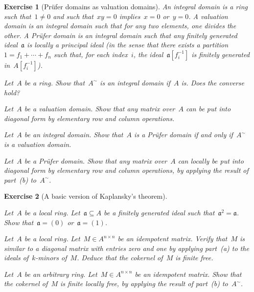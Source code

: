 \documentclass{ws-rv9x6}
\newtheorem{ex}{Exercise}
\newenvironment{exercise}[1]{
  \begin{ex}[#1]
}{\end{ex}}
\newcommand{\aaa}{\mathfrak{a}}
\renewcommand{\_}{\mathpunct{.}}
\newcommand{\?}{\,{:}\,}
\begin{document}
\begin{exercise}{Prüfer domains as valuation domains}%
An \emph{integral domain} is a ring such that~$1 \neq 0$ and such that~$xy = 0$
implies~$x = 0$ or~$y = 0$. A \emph{valuation domain} is an integral domain
such that for any two elements, one divides the other. A \emph{Prüfer domain}
is an integral domain such that any finitely generated ideal~$\aaa$ is locally a
principal ideal (in the sense that there exists a partition~$1 = f_1 + \cdots +
f_n$ such that, for each index~$i$, the ideal~$\aaa[f_i^{-1}]$ is finitely
generated in~$A[f_i^{-1}]$).
\begin{alphlist}[(d)]
\item Let~$A$ be a ring. Show that~$A^\sim$ is an integral domain if~$A$ is.
Does the converse hold?
\item Let~$A$ be a valuation domain. Show that any matrix over~$A$ can be put
into diagonal form by elementary row and column operations.
\item Let~$A$ be an integral domain. Show that~$A$ is a Prüfer domain if and
only if~$A^\sim$ is a valuation domain.
\item Let~$A$ be a Prüfer domain. Show that any matrix over~$A$ can locally be
put into diagonal form by elementary row and column operations, by applying the
result of part~(b) to~$A^\sim$.
\end{alphlist}
\end{exercise}

\begin{exercise}{A basic version of Kaplansky's theorem}
\begin{alphlist}[(c)]
\item Let~$A$ be a local ring. Let~$\aaa \subseteq A$ be a finitely generated
ideal such that~$\aaa^2 = \aaa$. Show that~$\aaa = (0)$ or~$\aaa = (1)$.
\item Let~$A$ be a local ring. Let~$M \in A^{n \times n}$ be an idempotent
matrix. Verify that~$M$ is similar to a diagonal matrix with entries zero and
one by applying part~(a) to the ideals of~$k$-minors of~$M$. Deduce that the
cokernel of~$M$ is finite free.
\item Let~$A$ be an arbitrary ring. Let~$M \in A^{n \times n}$ be an idempotent
matrix. Show that the cokernel of~$M$ is finite locally free, by applying the
result of part~(b) to~$A^\sim$.
\end{alphlist}
\end{exercise}



\end{document}
